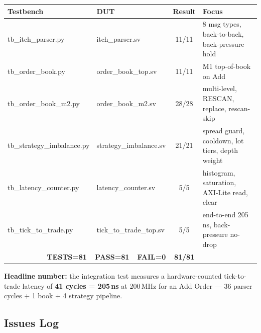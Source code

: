 \documentclass[11pt,a4paper]{article}
\begin{document}
\begin{center}
\small
\begin{tabular}{l l c l}
\toprule
\textbf{Testbench} & \textbf{DUT} & \textbf{Result} & \textbf{Focus} \\
\midrule
\rowcolor{fixgreen!12}
tb\_itch\_parser.py        & itch\_parser.sv        & 11/11 & 8 msg types, back-to-back, back-pressure hold \\
\rowcolor{fixgreen!12}
tb\_order\_book.py         & order\_book\_top.sv    & 11/11 & M1 top-of-book on Add \\
\rowcolor{fixgreen!12}
tb\_order\_book\_m2.py     & order\_book\_m2.sv     & 28/28 & multi-level, RESCAN, replace, rescan-skip \\
\rowcolor{fixgreen!12}
tb\_strategy\_imbalance.py & strategy\_imbalance.sv & 21/21 & spread guard, cooldown, lot tiers, depth weight \\
\rowcolor{fixgreen!12}
tb\_latency\_counter.py    & latency\_counter.sv    & 5/5   & histogram, saturation, AXI-Lite read, clear \\
\rowcolor{fixgreen!12}
tb\_tick\_to\_trade.py     & tick\_to\_trade\_top.sv & 5/5  & end-to-end 205\,ns, back-pressure no-drop \\
\midrule
\multicolumn{2}{r}{\bfseries TESTS=81\ \ PASS=81\ \ FAIL=0} & \textbf{81/81} & \\
\bottomrule
\end{tabular}
\end{center}

\noindent\textbf{Headline number:} the integration test measures a
hardware-counted tick-to-trade latency of \textbf{41 cycles = 205\,ns} at
200\,MHz for an Add Order --- 36 parser cycles $+$ 1 book $+$ 4 strategy pipeline.

\subsection{Issues Log}
\end{document}

